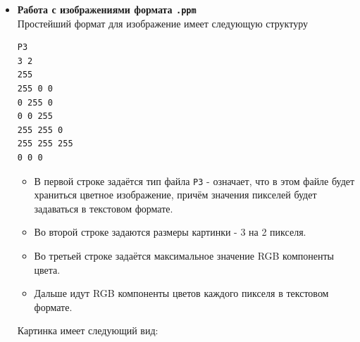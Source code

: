 \documentclass{article}
\begin{document}
\begin{itemize}
\begin{lstlisting}
    while ((c = fgetc(f)) != EOF)
    {
        if (c >= '0' && c <= '9')
            num_of_digits += 1;
    }
    printf("Number of digits = %d\n", num_of_digits);
    fclose(f);
}
\end{lstlisting}
\begin{itemize}
\item Написать программу \texttt{symbolcount}, которая считает количество символов в файле. название файла должно передаваться через аргумент командной строки:\\
\begin{verbatim}
gcc -o symbolcount main.c
./symbolcount war_and_peace.txt
3332371
\end{verbatim}
\item Написать программу \texttt{linecount}, которая находит количество строк в файле.
\item Написать программу \texttt{wordcount}, которая находит количество слов в файле. Слово это любая последовательность символов, разделённая одним или несколькими пробельными, символами. Пробельные символы это пробел, перенос на новую строку(\texttt{\textbackslash n}) либо табуляция(\texttt{\textbackslash t}).
\end{itemize}

\item \textbf{Работа с изображениями формата \texttt{.ppm}}\\
Простейший формат для изображение имеет следующую структуру
\begin{verbatim}
P3
3 2
255
255 0 0 
0 255 0  
0 0 255 
255 255 0 
255 255 255 
0 0 0
\end{verbatim}
\begin{itemize}
\item В первой строке задаётся тип файла \texttt{P3} - означает, что в этом файле будет храниться цветное изображение, причём значения пикселей будет задаваться в текстовом формате.
\item Во второй строке задаются размеры картинки - 3 на 2 пикселя.
\item Во третьей строке задаётся максимальное значение RGB компоненты цвета.
\item Дальше идут RGB компоненты цветов каждого пикселя в текстовом формате.
\end{itemize}
Картинка имеет следующий вид:


\end{itemize}
\end{document}
